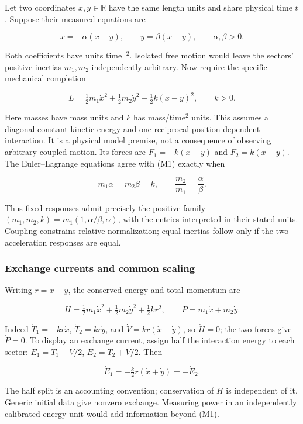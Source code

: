 \documentclass[11pt,a4paper]{article}
\begin{document}
Let two coordinates \(x,y\in\mathbb R\) have the same length units and
share physical time \(t\). Suppose their measured equations are

\[\ddot x=-\alpha(x-y),\qquad
\ddot y=\beta(x-y),\qquad \alpha,\beta>0. \tag{M1}\]

Both coefficients have units time\(^{-2}\). Isolated free motion would
leave the sectors' positive inertias \(m_1,m_2\) independently
arbitrary. Now require the specific mechanical completion

\[L=\tfrac12m_1\dot x^2+\tfrac12m_2\dot y^2
-\tfrac12k(x-y)^2,\qquad k>0. \tag{M2}\]

Here masses have mass units and \(k\) has mass/time\(^2\) units. This
assumes a diagonal constant kinetic energy and one reciprocal
position-dependent interaction. It is a physical model premise, not a
consequence of observing arbitrary coupled motion. Its forces are
\(F_1=-k(x-y)\) and \(F_2=k(x-y)\). The Euler--Lagrange equations agree
with (M1) exactly when

\[m_1\alpha=m_2\beta=k,
\qquad \frac{m_2}{m_1}=\frac\alpha\beta. \tag{M3}\]

Thus fixed responses admit precisely the positive family
\((m_1,m_2,k)=m_1(1,\alpha/\beta,\alpha)\), with the entries interpreted
in their stated units. Coupling constrains relative normalization; equal
inertias follow only if the two acceleration responses are equal.

\hypertarget{exchange-currents-and-common-scaling}{%
\subsubsection{Exchange currents and common
scaling}\label{exchange-currents-and-common-scaling}}

Writing \(r=x-y\), the conserved energy and total momentum are

\[H=\tfrac12m_1\dot x^2+\tfrac12m_2\dot y^2+\tfrac12kr^2,
\qquad P=m_1\dot x+m_2\dot y. \tag{M4}\]

Indeed \(\dot T_1=-kr\dot x\), \(\dot T_2=kr\dot y\), and
\(\dot V=kr(\dot x-\dot y)\), so \(\dot H=0\); the two forces give
\(\dot P=0\). To display an exchange current, assign half the
interaction energy to each sector: \(E_1=T_1+V/2\), \(E_2=T_2+V/2\).
Then

\[\dot E_1=-\tfrac{k}{2}r(\dot x+\dot y)=-\dot E_2. \tag{M5}\]

The half split is an accounting convention; conservation of \(H\) is
independent of it. Generic initial data give nonzero exchange. Measuring
power in an independently calibrated energy unit would add information
beyond (M1).
\end{document}
